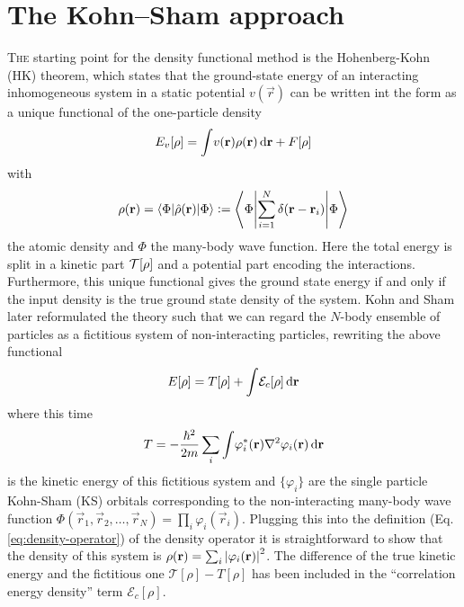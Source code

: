 	\section{The Kohn--Sham approach}	
	\lettrine[lines=3,findent=3pt,nindent=0pt]{T}{he} starting point for the density functional method is the Hohenberg-Kohn (HK) theorem\cite{Hohenberg1964}, which states that the ground-state energy of an interacting inhomogeneous system in a static potential $v(\vec{r})$ can be written  int the form as a unique functional of the one-particle density
	\begin{align}
		E_v[\rho] = \int\!v(\bm{\mathrm{r}})\rho(\bm{\mathrm{r}})\,\mathrm{d}{\bm{\mathrm{r}}}+F[\rho] \label{eq1}
	\end{align}
	with
	\begin{align}\label{eq:density-operator}
		\rho({\mathbf r})= \ev**{\hat\rho(\vec{r})}{\Phi} \vcentcolon= \ev**{\sum _{i=1}^{N}\delta({\mathbf r}-{\mathbf r}_i)}{\Phi}
	\end{align}
	the atomic density and $\Phi$ the many-body wave function. Here the total energy is split in a kinetic part ${\cal T}[\rho]$ and a potential part encoding the interactions. Furthermore, this unique functional gives the ground state energy if and only if the input density is the true ground state density of the system. Kohn and Sham later reformulated\citep{Kohn1965} the theory such that we can regard the $N$-body ensemble of particles as a fictitious system of non-interacting particles, rewriting the above functional 
	\begin{equation}
		E[\rho] = T[\rho] + \int\!{\cal E}_c[\rho]\,\mathrm{d}{\bm{\mathrm{r}}} \label{eq:ks-tot-energy}
	\end{equation}
	where this time
	\begin{equation}
		T= -\frac{\hbar^2}{2m} \sum_i \int\! \varphi_i^*({\mathbf r})\laplacian \varphi_i({\mathbf r})\diff{r} \label{eq:kin-energy}
	\end{equation}
	is the kinetic energy of this fictitious system and $\{\varphi_i\}$ are the single particle Kohn-Sham (KS) orbitals corresponding to the non-interacting many-body wave function $\Phi(\vec{r}_1,\vec{r}_2,\ldots,\vec{r}_N)=\prod_i\varphi_i(\vec{r}_i)$. Plugging this into the definition (Eq. \ref{eq:density-operator}) of the density operator it is straightforward to show that the density of this system is $\rho(\vec{r})=\sum_i\absolutevalue{\varphi_i(\vec{r})}^2$. The difference of the true kinetic energy and the fictitious one $\mathcal{T}[\rho]-T[\rho]$ has been included in the ``correlation energy density'' term $\mathcal{E}_c[\rho]$.\\
	
